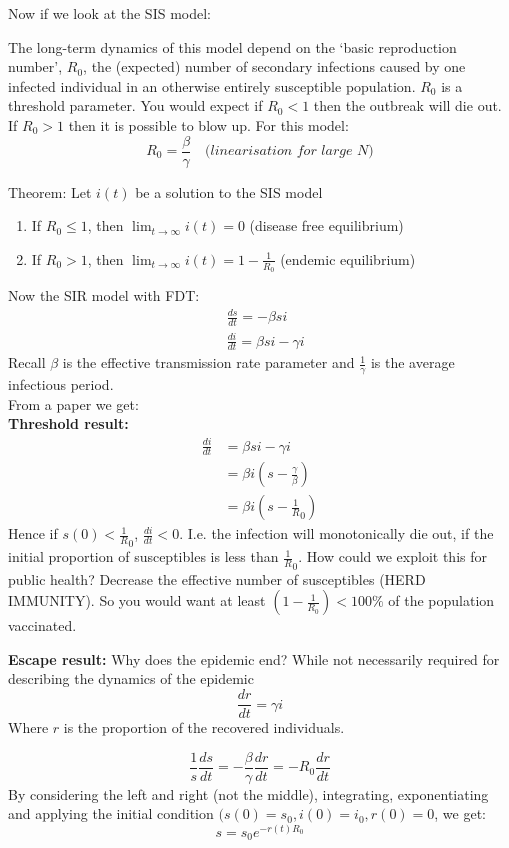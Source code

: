 \documentclass{/home/janmebows/Documents/LatexTemplates/myassignment}
\begin{document}
Now if we look at the SIS model:


The long-term dynamics of this model depend on the `basic reproduction number', $R_0$, the (expected) number of secondary infections caused by one infected individual in an otherwise entirely susceptible population. $R_0$ is a threshold parameter. You would expect if $R_0 < 1$ then the outbreak will die out. If $R_0 >1$ then it is possible to blow up. For this model:
\[R_0 = \frac\beta\gamma   \quad \textit{(linearisation for large } N \textit{)} \]


Theorem:
Let $i(t)$ be a solution to the SIS model
\begin{enumerate}
    \item If $R_0 \leq 1$, then $\lim_{t\to\infty} i(t) = 0$ (disease free equilibrium)
    \item If $R_0 > 1$, then $\lim_{t\to\infty} i(t) = 1 - \frac{1}{R_0}$ (endemic equilibrium)
\end{enumerate}


Now the SIR model with FDT:\\
\begin{align*}
    &\frac{ds}{dt} = -\beta si\\
    &\frac{di}{dt} = \beta si - \gamma i
\end{align*}
Recall $\beta$ is the effective transmission rate parameter and $\frac1\gamma$ is the average infectious period.\\
From a paper we get:\\
\textbf{Threshold result: }
\begin{align*}
    \frac{di}{dt} &= \beta si - \gamma i\\
    &= \beta i(s - \frac\gamma\beta)\\
    &= \beta i(s - \frac1R_0)
\end{align*}
Hence if $s(0) < \frac1R_0$, $\frac{di}{dt} < 0$. I.e. the infection will monotonically die out, if the initial proportion of susceptibles is less than $\frac1R_0$.
How could we exploit this for public health? Decrease the effective number of susceptibles (HERD IMMUNITY). So you would want at least $(1-\frac{1}{R_0}) < 100\%$ of the population vaccinated.

\textbf{Escape result:}
Why does the epidemic end? While not necessarily required for describing the dynamics of the epidemic
\[\frac{dr}{dt} = \gamma i\]
Where $r$ is the proportion of the recovered individuals.

\[\frac1s \frac{ds}{dt} = -\frac\beta\gamma \frac{dr}{dt} = -R_0 \frac{dr}{dt}\] 
By considering the left and right (not the middle), integrating, exponentiating and applying the initial condition $(s(0) = s_0, i(0) = i_0, r(0) = 0$, we get:
\[s = s_0 e^{-r(t)  R_0}\]
\end{document}
